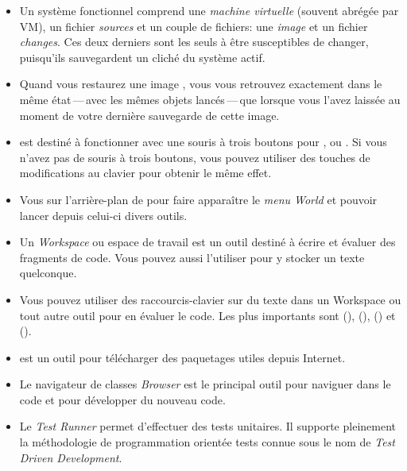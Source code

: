 \documentclass[a4paper,10pt,twoside]{book}
\begin{document}
\begin{itemize}
  \item Un système \pharo fonctionnel comprend une \emph{machine
      virtuelle} (souvent abrégée par VM), un fichier
    \emph{sources} et un couple de fichiers: une \emph{image} et un
    fichier \emph{changes}. Ces deux derniers sont les seuls à
    être susceptibles de changer, puisqu'ils sauvegardent un cliché
    du système actif.
  \item Quand vous restaurez une image \pharo, vous vous retrouvez
    exactement dans le même état\,---\,avec les mêmes objets
    lancés\,---\,que lorsque vous l'avez laissée au moment de votre dernière
    sauvegarde de cette image.
  \item \pharo est destiné à fonctionner avec une souris à trois
    boutons pour \click, \actclick ou \metaclick.
 Si vous n'avez pas de souris à trois boutons, vous pouvez utiliser
 des touches de modifications au clavier pour obtenir le même effet.
  \item Vous \clickz sur l'arrière-plan de
    \pharo pour faire apparaître le \emph{menu World} et pouvoir
    lancer depuis celui-ci divers outils.
  \item Un \emph{Workspace} ou espace de travail est un outil
    destiné à écrire et évaluer des fragments de code. Vous
    pouvez aussi l'utiliser pour y stocker un texte quelconque.
  \item Vous pouvez utiliser des raccourcis-clavier sur du texte
    dans un Workspace ou tout autre outil pour en
    évaluer le code. Les plus importants sont 
    (),  (), 
    () et  ().
  \item \sqmap est un outil pour télécharger des paquetages utiles
    depuis Internet.
  \item Le navigateur de classes \emph{Browser} est le
    principal outil pour naviguer dans le code \pharo et pour
    développer du nouveau code.
  \item Le \emph{Test Runner} permet d'effectuer des tests
    unitaires. Il supporte pleinement la méthodologie de
    programmation orientée tests connue sous le nom de \emph{Test
      Driven Development}.
\end{itemize}

\ifx\wholebook\relax\else 
   
   
\end{document}
